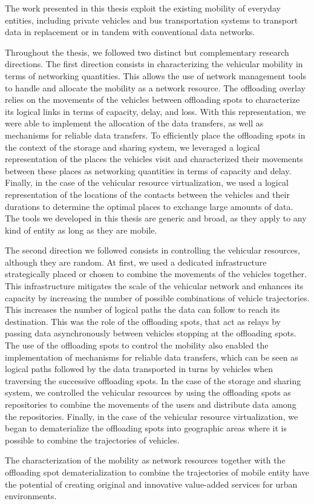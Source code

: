 The work presented in this thesis exploit the existing mobility of everyday entities, including private vehicles and bus transportation systems to transport data in replacement or in tandem with conventional data networks. 

Throughout the thesis, we followed two distinct but complementary research directions. The first direction consists in characterizing the vehicular mobility in terms of networking quantities. This allows the use of network management tools to handle and allocate the mobility as a network resource.
The offloading overlay relies on the movements of the vehicles between offloading spots to characterize its logical links in terms of capacity, delay, and loss. With this representation, we were able to implement the allocation of the data transfers, as well as mechanisms for reliable data transfers. To efficiently place the offloading spots in the context of the storage and sharing system, we leveraged a logical representation of the places the vehicles visit and characterized their movements between these places as networking quantities in terms of capacity and delay. Finally, in the case of the vehicular resource virtualization, we used a logical representation of the locations of the contacts between the vehicles and their durations to determine the optimal places to exchange large amounts of data. The tools we developed in this thesis are generic and broad, as they apply to any kind of entity as long as they are mobile.

The second direction we followed consists in controlling the vehicular resources, although they are random. At first, we used a dedicated infrastructure strategically placed or chosen to combine the movements of the vehicles together. This infrastructure mitigates the scale of the vehicular network and enhances its capacity by increasing the number of possible combinations of vehicle trajectories. This increases the number of logical paths the data can follow to reach its destination. This was the role of the offloading spots, that act as relays by passing data asynchronously between vehicles stopping at the offloading spots. The use of the offloading spots to control the mobility also enabled the implementation of mechanisms for reliable data transfers, which can be seen as logical paths followed by the data transported in turns by vehicles when traversing the successive offloading spots. In the case of the storage and sharing system, we controlled the vehicular resources by using the offloading spots as repositories to combine the movements of the users and distribute data among the repositories. Finally, in the case of the vehicular resource virtualization, we began to dematerialize the offloading spots into geographic areas where it is possible to combine the trajectories of vehicles. 


The characterization of the mobility as network resources together with the offloading spot dematerialization to combine the trajectories of mobile entity have the potential of creating original and innovative value-added services for urban environments.
